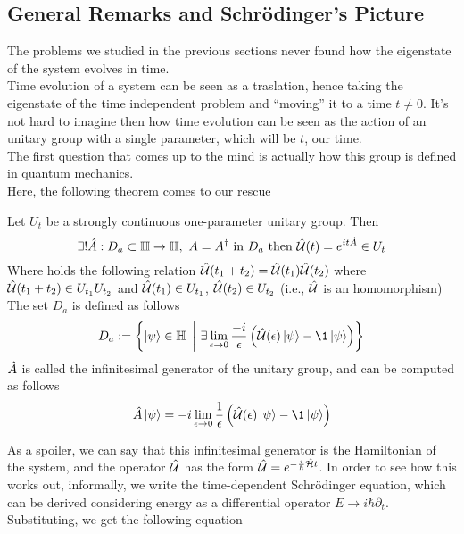 \documentclass[../qm.tex]{subfiles}
\begin{document}
	\subsection{General Remarks and Schrödinger's Picture}
	The problems we studied in the previous sections never found how the eigenstate of the system evolves in time.\\
	Time evolution of a system can be seen as a traslation, hence taking the eigenstate of the time independent problem and ``moving'' it to a time $t\ne0$. It's not hard to imagine then how time evolution can be seen as the action of an unitary group with a single parameter, which will be $t$, our time.\\
	The first question that comes up to the mind is actually how this group is defined in quantum mechanics.\\
	Here, the following theorem comes to our rescue
	\begin{thm}
		Let $U_t$ be a strongly continuous one-parameter unitary group. Then
		\begin{equation*}
			\exists!\opr{A}:D_a\subset\mathbb{H}\to\mathbb{H},\ A=\adj{A}\text{ in }D_a\text{ then }\Ut(t)=e^{it\opr{A}}\in U_t
		\end{equation*}
		Where holds the following relation $\hat{\mathcal{U}}(t_1+t_2)=\hat{\mathcal{U}}(t_1)\hat{\mathcal{U}}(t_2)$ where $\hat{\mathcal{U}}(t_1+t_2)\in U_{t_1}U_{t_2}$ and $\hat{\mathcal{U}}(t_1)\in U_{t_1}$, $\hat{\mathcal{U}}(t_2)\in U_{t_2}$ (i.e., $\hat{\mathcal{U}}$ is an homomorphism)\\
		The set $D_a$ is defined as follows
		\begin{equation*}
		D_a:=\left\{ \ket{\psi}\in\mathbb{H}\ \left|\ \exists\lim_{\epsilon\to0}\frac{-i}{\epsilon}\left( \Ut(\epsilon)\ket{\psi}-\1\ket{\psi} \right) \right\}\right.
		\end{equation*}
		$\hat{A}$ is called the infinitesimal generator of the unitary group, and can be computed as follows
		\begin{equation*}
			\opr{A}\ket{\psi}=-i\lim_{\epsilon\to0}\frac{1}{\epsilon}\left( \Ut(\epsilon)\ket{\psi}-\1\ket{\psi} \right)
		\end{equation*}
	\end{thm}
	As a spoiler, we can say that this infinitesimal generator is the Hamiltonian of the system, and the operator $\hat{\mathcal{U}}$ has the form $\hat{\mathcal{U}}=e^{-\frac{i}{\hbar}\hat{\mathcal{H}}t}$. In order to see how this works out, informally, we write the time-dependent Schrödinger equation, which can be derived considering energy as a differential operator $E\to i\hbar\partial_t$. Substituting, we get the following equation
\end{document}
